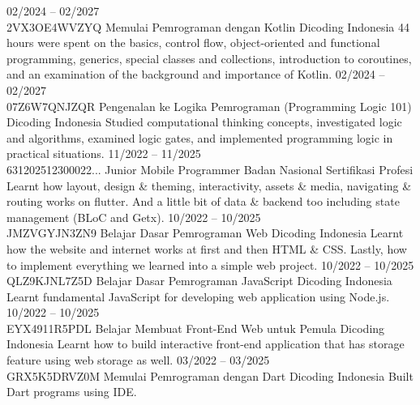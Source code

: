 \documentclass[9pt]{developercv} %
\begin{document}
\begin{entrylist}
	\entry
	{02/2024 -- 02/2027
		\\\footnotesize{2VX3OE4WVZYQ}}
	{Memulai Pemrograman dengan Kotlin}
	{Dicoding Indonesia}
	{44 hours were spent on the basics, control flow, object-oriented and functional programming, generics, special classes and collections, introduction to coroutines, and an examination of the background and importance of Kotlin.}
	\entry
	{02/2024 -- 02/2027
		\\\footnotesize{07Z6W7QNJZQR}}
	{Pengenalan ke Logika Pemrograman (Programming Logic 101)}
	{Dicoding Indonesia}
	{Studied computational thinking concepts, investigated logic and algorithms, examined logic gates, and implemented programming logic in practical situations.}
	\entry
	{11/2022 -- 11/2025
		\\\footnotesize{631202512300022...}}
	{Junior Mobile Programmer}
	{Badan Nasional Sertifikasi Profesi}
	{Learnt how layout, design \& theming, interactivity, assets \& media, navigating \& routing works on flutter. And a little bit of data \& backend too including state management (BLoC and Getx).}
	\entry
	{10/2022 -- 10/2025
		\\\footnotesize{JMZVGYJN3ZN9}}
	{Belajar Dasar Pemrograman Web}
	{Dicoding Indonesia}
	{Learnt how the website and internet works at first and then HTML \& CSS. Lastly, how to implement everything we learned into a simple web project.}
	\entry
	{10/2022 -- 10/2025
		\\\footnotesize{QLZ9KJNL7Z5D}}
	{Belajar Dasar Pemrograman JavaScript}
	{Dicoding Indonesia}
	{Learnt fundamental JavaScript for developing web application using Node.js.}
	\entry
	{10/2022 -- 10/2025
		\\\footnotesize{EYX4911R5PDL}}
	{Belajar Membuat Front-End Web untuk Pemula}
	{Dicoding Indonesia}
	{Learnt how to build interactive front-end application that has storage feature using web storage as well.}
	\entry
	{03/2022 -- 03/2025
		\\\footnotesize{GRX5K5DRVZ0M}}
	{Memulai Pemrograman dengan Dart}
	{Dicoding Indonesia}
	{Built Dart programs using IDE.}
\end{entrylist}
\end{document}
